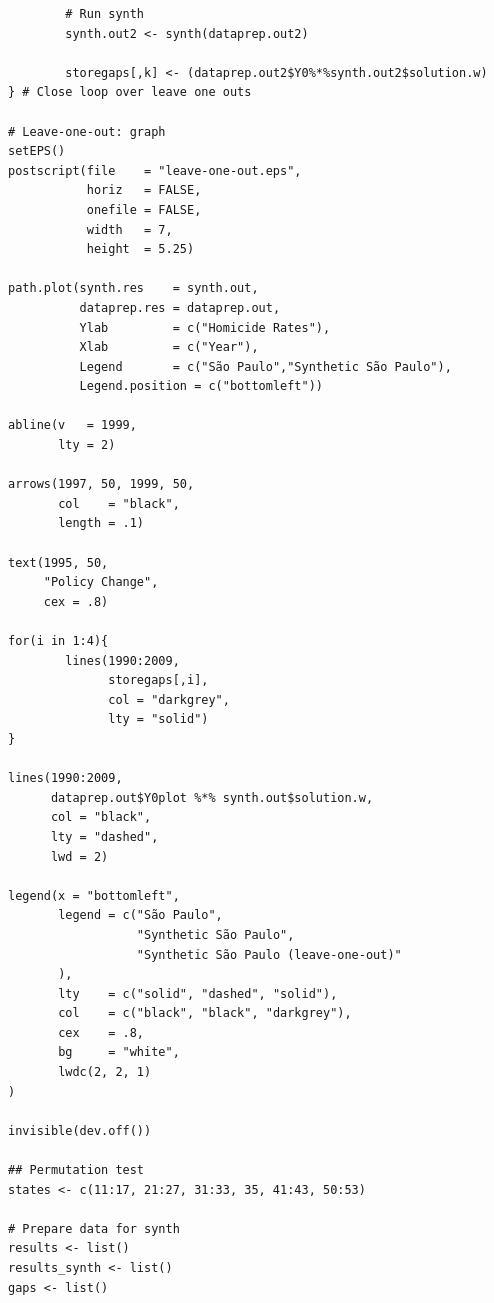 \begin{verbatim}
        # Run synth
        synth.out2 <- synth(dataprep.out2)

        storegaps[,k] <- (dataprep.out2$Y0%*%synth.out2$solution.w)
} # Close loop over leave one outs

# Leave-one-out: graph
setEPS()
postscript(file    = "leave-one-out.eps",
           horiz   = FALSE,
           onefile = FALSE,
           width   = 7,
           height  = 5.25)

path.plot(synth.res    = synth.out,
          dataprep.res = dataprep.out,
          Ylab         = c("Homicide Rates"),
          Xlab         = c("Year"),
          Legend       = c("São Paulo","Synthetic São Paulo"),
          Legend.position = c("bottomleft"))

abline(v   = 1999,
       lty = 2)

arrows(1997, 50, 1999, 50,
       col    = "black",
       length = .1)

text(1995, 50,
     "Policy Change",
     cex = .8)

for(i in 1:4){
        lines(1990:2009,
              storegaps[,i],
              col = "darkgrey",
              lty = "solid")
}

lines(1990:2009,
      dataprep.out$Y0plot %*% synth.out$solution.w,
      col = "black",
      lty = "dashed",
      lwd = 2)

legend(x = "bottomleft",
       legend = c("São Paulo",
                  "Synthetic São Paulo",
                  "Synthetic São Paulo (leave-one-out)"
       ),
       lty    = c("solid", "dashed", "solid"),
       col    = c("black", "black", "darkgrey"),
       cex    = .8,
       bg     = "white",
       lwdc(2, 2, 1)
)

invisible(dev.off())

## Permutation test
states <- c(11:17, 21:27, 31:33, 35, 41:43, 50:53)

# Prepare data for synth
results <- list()
results_synth <- list()
gaps <- list()


\end{verbatim}
